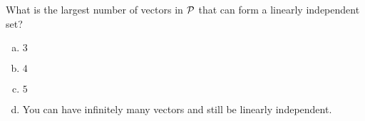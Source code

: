\begin{applicationActivities}
\begin{activity}{5}
What is the largest number of vectors in \(\P\) that can form a linearly independent set?
\begin{enumerate}[(a)]
\item \(3\)
\item \(4\)
\item \(5\)
\item You can have infinitely many vectors and still be linearly independent.
\end{enumerate}
\end{activity}



\end{applicationActivities}
